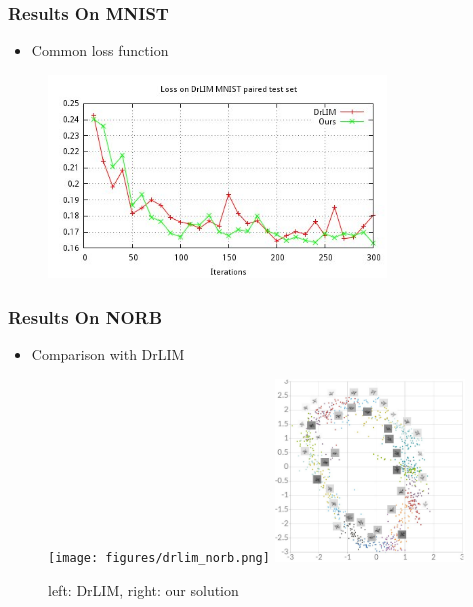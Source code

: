 \documentclass[10pt]{beamer}
\begin{document}
\begin{frame}
    \frametitle{Results On MNIST}
    \begin{itemize}
        \item Common loss function
    \end{itemize}

    \begin{figure}[h]
        \begin{center}
            \includegraphics[width=0.8\textwidth]{../report/thesis_figures/final_loss_test2bv7.jpg}
        \end{center}
    \end{figure}
\end{frame}


\begin{frame}
    \frametitle{Results On NORB}
    \begin{itemize}
        \item Comparison with DrLIM
    \end{itemize}


    \begin{figure}[h]
        \begin{center}
            \texttt{[image: figures/drlim\_norb.png]}
            \vspace{1cm}
            \includegraphics[width=0.45\textwidth]{../report/thesis_figures/norb_cl2d.jpg}
        \end{center}
        \caption{left: DrLIM, right: our solution}
    \end{figure}
\end{frame}
\end{document}
